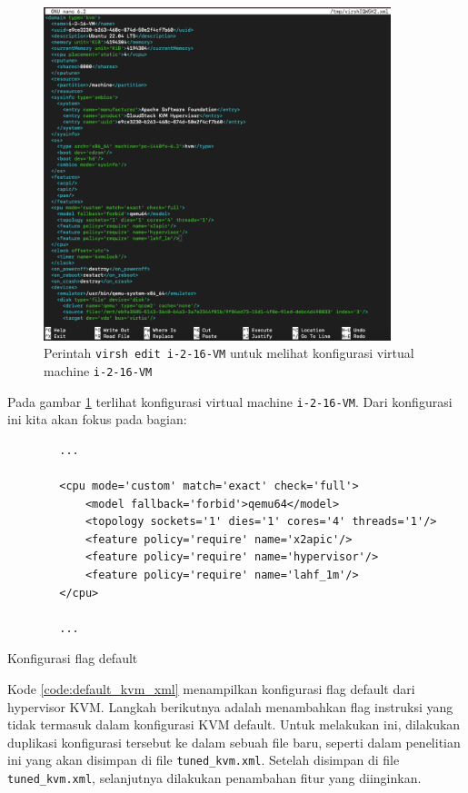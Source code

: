 \begin{figure}
    \centering
    \includegraphics[width=0.9\textwidth]
    {assets/pics/virsh_edit1.png}
    \caption{Perintah \texttt{virsh edit i-2-16-VM} untuk melihat konfigurasi virtual machine \texttt{i-2-16-VM}}
    \label{fig:virsh_edit1}
\end{figure}

Pada gambar \ref{fig:virsh_edit1} terlihat konfigurasi virtual machine \texttt{i-2-16-VM}. Dari konfigurasi ini kita akan fokus pada bagian:

\begin{listing}[H]
    \begin{verbatim}
        ...

        <cpu mode='custom' match='exact' check='full'>
            <model fallback='forbid'>qemu64</model>
            <topology sockets='1' dies='1' cores='4' threads='1'/>
            <feature policy='require' name='x2apic'/>
            <feature policy='require' name='hypervisor'/> 
            <feature policy='require' name='lahf_1m'/>
        </cpu>
        
        ...
    \end{verbatim}
    \caption{Konfigurasi flag default}
    \label{code:default_kvm_xml}
\end{listing}

Kode \ref{code:default_kvm_xml} menampilkan konfigurasi flag default dari hypervisor KVM. Langkah berikutnya adalah menambahkan flag instruksi yang tidak termasuk dalam konfigurasi KVM default. Untuk melakukan ini, dilakukan duplikasi konfigurasi tersebut ke dalam sebuah file baru, seperti dalam penelitian ini yang akan disimpan di file \texttt{tuned\_kvm.xml}. Setelah disimpan di file \texttt{tuned\_kvm.xml}, selanjutnya dilakukan penambahan fitur yang diinginkan.

